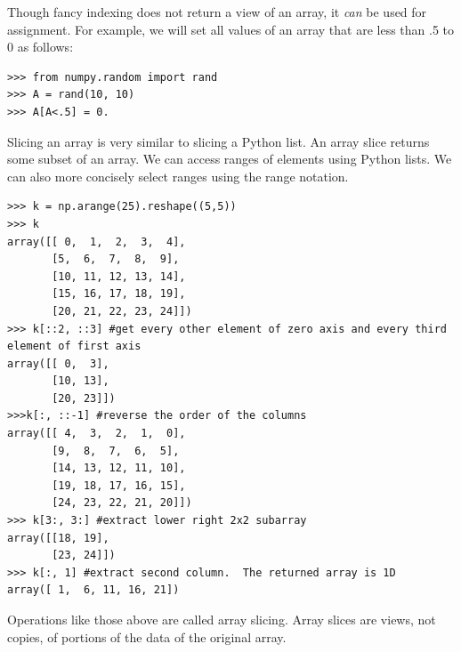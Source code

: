 Though fancy indexing does not return a view of an array, it \emph{can} be used for assignment.
For example, we will set all values of an array that are less than .5 to 0 as follows:
\begin{lstlisting}
>>> from numpy.random import rand
>>> A = rand(10, 10)
>>> A[A<.5] = 0.
\end{lstlisting}

Slicing an array is very similar to slicing a Python list.
An array slice returns some subset of an array.
We can access ranges of elements using Python lists.
We can also more concisely select ranges using the  range notation.
\begin{lstlisting}
>>> k = np.arange(25).reshape((5,5))
>>> k
array([[ 0,  1,  2,  3,  4],
       [5,  6,  7,  8,  9],
       [10, 11, 12, 13, 14],
       [15, 16, 17, 18, 19],
       [20, 21, 22, 23, 24]])
>>> k[::2, ::3] #get every other element of zero axis and every third element of first axis
array([[ 0,  3],
       [10, 13],
       [20, 23]])
>>>k[:, ::-1] #reverse the order of the columns
array([[ 4,  3,  2,  1,  0],
       [9,  8,  7,  6,  5],
       [14, 13, 12, 11, 10],
       [19, 18, 17, 16, 15],
       [24, 23, 22, 21, 20]])
>>> k[3:, 3:] #extract lower right 2x2 subarray
array([[18, 19],
       [23, 24]])
>>> k[:, 1] #extract second column.  The returned array is 1D
array([ 1,  6, 11, 16, 21])
\end{lstlisting}
Operations like those above are called array slicing.
Array slices are views, not copies, of portions of the data of the original array.


